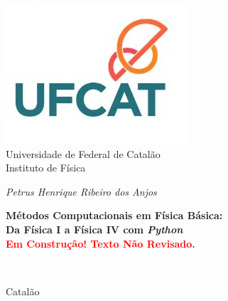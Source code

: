 	\pagestyle{empty}
	\baselineskip 0.7cm
	
	\begin{titlepage}
		\begin{center}
			\includegraphics[scale=0.5]{Images/UFCat-logo.jpeg}\\
			{\large\sc Universidade de Federal de Catalão\\
				Instituto de Física}
		\end{center}
		
		\vspace{3.0cm}
		
		\begin{center}
			{\large\em Petrus Henrique Ribeiro dos Anjos}
		\end{center}
		
		\vspace{3.0cm}
		
		\begin{center}
			{\large \sc\bf  Métodos Computacionais em Física Básica:\\
			Da Física I a Física IV com {\it Python}\\
			\textcolor{red}{Em Construção! Texto Não Revisado.}}
		\end{center}
		
		
		
		\
		
		\vspace{5.0cm}
		
		\begin{center}{\large\sc Catalão}\end{center}
		\begin{center}{\large{}}\end{center}
		
	\end{titlepage}
	
	\newpage
	
	
